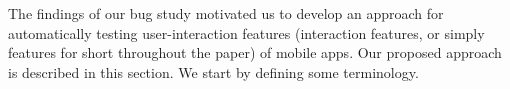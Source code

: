 \label{framework}


The findings of our bug study motivated us to develop an approach for automatically testing user-interaction features (interaction features, or simply features for short throughout the paper) of mobile apps. Our proposed approach is described in this section. We start by defining some terminology.













